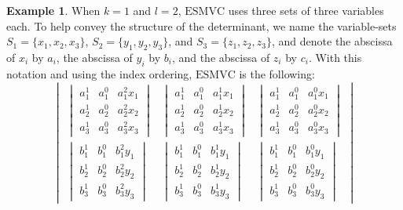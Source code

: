 \documentclass[11pt]{article}
\numberwithin{equation}{section}
\theoremstyle{definition}
\newtheorem{example}[theorem]{Example}
\theoremstyle{plain}
\newcommand{\SMVanOne}{{\ensuremath{\mathrm{ESMVC}}}}
\begin{document}
\begin{example}
  \label{ex.smvan1.k1l2}
  When \(k=1\) and \(l=2\), \(\SMVanOne\) uses three sets of three
  variables each.
  To help convey the structure of the determinant,
  we name the variable-sets
  \(S_1 = \{x_1,x_2,x_3\}\),
  \(S_2 = \{y_1,y_2,y_3\}\), and
  \(S_3 = \{z_1,z_2,z_3\}\),
  and denote the abscissa of \(x_i\) by \(a_i\),
  the abscissa of \(y_i\) by \(b_i\),
  and the abscissa of \(z_i\) by \(c_i\).
  With this notation and using the index ordering, \(\SMVanOne\) is the following:
  \begingroup\renewcommand{\arraystretch}{1.5}
  \[
    \begin{vmatrix*}
      \begin{vmatrix*}
        a_1^1 & a_1^0 & a_1^2 x_1 \\
        a_2^1 & a_2^0 & a_2^2 x_2 \\
        a_3^1 & a_3^0 & a_3^2 x_3
      \end{vmatrix*}
      &
      \begin{vmatrix*}
        a_1^1 & a_1^0 & a_1^1 x_1 \\
        a_2^1 & a_2^0 & a_2^1 x_2 \\
        a_3^1 & a_3^0 & a_3^1 x_3 
      \end{vmatrix*}
      &
      \begin{vmatrix*}
        a_1^1 & a_1^0 & a_1^0 x_1 \\
        a_2^1 & a_2^0 & a_2^0 x_2 \\
        a_3^1 & a_3^0 & a_3^0 x_3 
      \end{vmatrix*}
      \\
      \begin{vmatrix*}
        b_1^1 & b_1^0 & b_1^2 y_1 \\
        b_2^1 & b_2^0 & b_2^2 y_2 \\
        b_3^1 & b_3^0 & b_3^2 y_3 
      \end{vmatrix*}
      &
      \begin{vmatrix*}
        b_1^1 & b_1^0 & b_1^1 y_1 \\
        b_2^1 & b_2^0 & b_2^1 y_2 \\
        b_3^1 & b_3^0 & b_3^1 y_3 
      \end{vmatrix*}
      &
      \begin{vmatrix*}
        b_1^1 & b_1^0 & b_1^0 y_1 \\
        b_2^1 & b_2^0 & b_2^0 y_2 \\
        b_3^1 & b_3^0 & b_3^0 y_3 
      \end{vmatrix*}

\end{vmatrix*}\]
\end{example}
\end{document}

